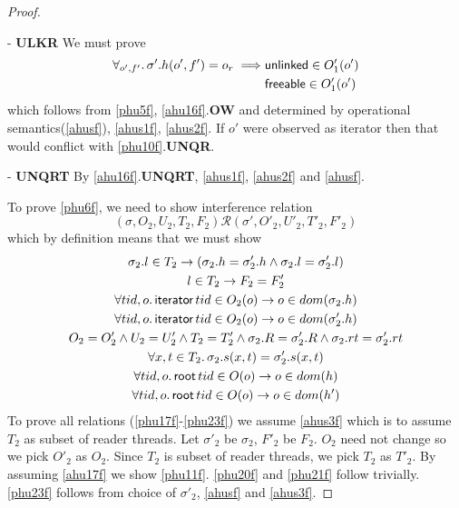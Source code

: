 \begin{proof}
\begin{case}
\end{case}
\begin{case} - \textbf{ULKR} We must prove 
  \begin{gather}\label{phuc2f}
\begin{aligned}
\forall_{o',f'} \ldotp \sigma'.h(o',f') = o_r \implies &\textsf{unlinked} \in O'_1(o') \\
 & \textsf{freeable} \in O'_1(o')
                \end{aligned}
\end{gather}
which follows from \ref{phu5f}, \ref{ahu16f}.\textbf{OW} and determined by operational semantics(\ref{ahusf}), \ref{ahus1f}, \ref{ahus2f}.  If $o'$ were observed as \textsf{iterator} then that would conflict with \ref{phu10f}.\textbf{UNQR}.
\end{case}
\begin{case} - \textbf{UNQRT} By \ref{ahu16f}.\textbf{UNQRT}, \ref{ahus1f}, \ref{ahus2f} and \ref{ahusf}.
\end{case}

To prove \ref{phu6f}, we need to show  interference relation
\[(\sigma, O_2, U_2, T_2,F_2) \mathcal{R} (\sigma', O'_2, U'_2, T'_2,F'_2)  \]
which by definition means that we must show 
\begin{gather}\label{phu17f}
  \sigma_2.l  \in  T_2 \rightarrow (\sigma_2.h =\sigma'_2.h \land \sigma_2.l=\sigma'_2.l)\\
  \label{phu18f}
  l\in T_2\rightarrow F_2=F_2'\\
  \label{phu20f}
  \forall tid,o\ldotp\textsf{iterator} \, tid \in O_2(o) \rightarrow o \in dom(\sigma_2.h) \\
  \label{phu21f}
  \forall tid,o\ldotp\textsf{iterator} \, tid \in O_2(o) \rightarrow o \in dom(\sigma'_2.h) \\
  \label{phu22f}
  O_2 = O_2' \land U_2 = U_2' \land T_2 = T_2' \land \sigma_2.R = \sigma'_2.R \land \sigma_2.rt = \sigma'_2.rt \\
  \label{phu23f}
  \forall x, t \in T_2 \ldotp \sigma_2.s(x,t) = \sigma'_2.s(x,t) \\
    \label{phufrt1}
  \forall tid,o\ldotp\textsf{root} \, tid \in O(o) \rightarrow o \in dom(h) \\
  \label{phufrt2}
  \forall tid,o\ldotp\textsf{root} \, tid \in O(o) \rightarrow o \in dom(h') 
\end{gather}
To prove all relations (\ref{phu17f}-\ref{phu23f}) we assume \ref{ahus3f} which is to assume $T_2$ as subset of reader threads. Let $\sigma'_2$ be $\sigma_2$, $F'_2$ be $F_2$. $O_2$ need not change so we pick $O'_2$  as $O_2$. Since $T_2$ is subset of reader threads, we pick $T_2$ as  $T'_2$. By assuming \ref{ahu17f}  we show \ref{phu11f}. \ref{phu20f} and \ref{phu21f} follow trivially. \ref{phu23f} follows from choice of $\sigma'_2$,  \ref{ahusf} and \ref{ahus3f}.


\end{proof}
